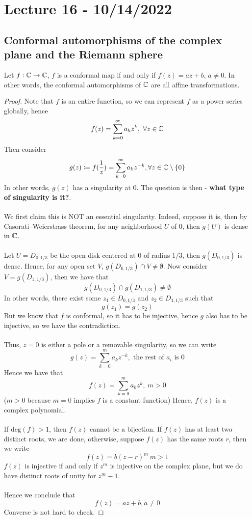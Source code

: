 \section{Lecture 16 - 10/14/2022}
\subsection{Conformal automorphisms of the complex plane and the Riemann sphere}

\begin{theorem}
    Let $f: \mathbb{C} \to \mathbb{C}$, $f$ is a conformal map if and only if $f(z) = az + b$, $a \neq 0$. In other words, the conformal automorphisms of $\mathbb{C}$ are all affine transformations.
\end{theorem}

\begin{proof}
    Note that $f$ is an entire function, so we can represent $f$ as a power series globally, hence
    \[f(z) = \sum_{k = 0}^\infty a_k z^k,\ \forall z \in \mathbb{C}\]
    Then consider
    \[g(z) \coloneqq f(\frac{1}{z}) = \sum_{k = 0}^\infty a_k z^{-k}, \forall z \in \mathbb{C} \setminus \{0\}\]
    In other words, $g(z)$ has a singularity at $0$. The question is then - \textbf{what type of singularity is it?}.\\\\
    We first claim this is NOT an essential singularity. Indeed, suppose it is, then by Casorati–Weierstrass theorem, for any neighborhood $U$ of $0$, then $g(U)$ is dense in $\mathbb{C}$.\\\\
    Let $U = D_{0, 1/3}$ be the open disk centered at $0$ of radius $1/3$, then $g(D_{0, 1/3})$ is dense. Hence, for any open set $V$, $g(D_{0, 1/3}) \cap V \neq \emptyset$. Now consider $V = g(D_{1, 1/3})$, then we have that
    \[g(D_{0, 1/3}) \cap g(D_{1, 1/3}) \neq \emptyset\]
    In other words, there exist some $z_1 \in D_{0, 1/3}$ and $z_2 \in D_{1, 1/3}$ such that
    \[g(z_1) = g(z_2)\]
    But we know that $f$ is conformal, so it has to be injective, hence $g$ also has to be injective, so we have the contradiction.\\\\
    Thus, $z = 0$ is either a pole or a removable singularity, so we can write
    \[g(z) = \sum_{k = 0}^m a_k z^{-k}, \text{ the rest of $a_i$ is $0$}\]
    Hence we have that
    \[f(z) = \sum_{k = 0}^m a_k z^k,\ m > 0\]
    ($m > 0$ because $m = 0$ implies $f$ is a constant function) Hence, $f(z)$ is a complex polynomial.\\\\
    If $\text{deg}(f) > 1$, then $f(z)$ cannot be a bijection. If $f(z)$ has at least two distinct roots, we are done, otherwise, suppose $f(z)$ has the same roots $r$, then we write
    \[f(z) = b (z - r)^m\ m > 1\]
    $f(z)$ is injective if and only if $z^m$ is injective on the complex plane, but we do have distinct roots of unity for $z^m - 1$.\\\\
    Hence we conclude that
    \[f(z) = az + b, a \neq 0\]
    Converse is not hard to check.
\end{proof}

